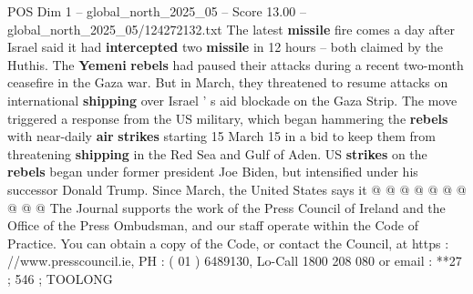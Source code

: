\begin{textsample}{POS Dim 1 – global\_north\_2025\_05 – Score 13.00 – global\_north\_2025\_05/124272132.txt}
The latest \textbf{missile} fire comes a day after Israel said it had \textbf{intercepted} two \textbf{missile} in 12 hours -- both claimed by the Huthis.
The \textbf{Yemeni} \textbf{rebels} had paused their attacks during a recent two-month ceasefire in the Gaza war.
But in March, they threatened to resume attacks on international \textbf{shipping} over Israel ' s aid blockade on the Gaza Strip.
The move triggered a response from the US military, which began hammering the \textbf{rebels} with near-daily \textbf{air} \textbf{strikes} starting 15 March 15 in a bid to keep them from threatening \textbf{shipping} in the Red Sea and Gulf of Aden.
US \textbf{strikes} on the \textbf{rebels} began under former president Joe Biden, but intensified under his successor Donald Trump.
Since March, the United States says it @ @ @ @ @ @ @ @ @ @ The Journal supports the work of the Press Council of Ireland and the Office of the Press Ombudsman, and our staff operate within the Code of Practice.
You can obtain a copy of the Code, or contact the Council, at https : //www.presscouncil.ie, PH : ( 01 ) 6489130, Lo-Call 1800 208 080 or email : **27 ; 546 ; TOOLONG

\end{textsample}
